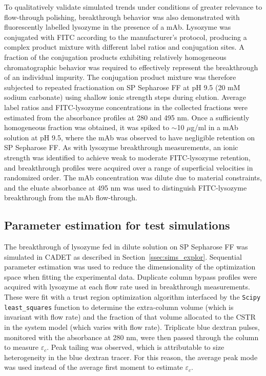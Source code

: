 \documentclass[preprint,review,12pt]{elsarticle}
\begin{document}
        To qualitatively validate simulated trends under conditions of greater relevance to flow-through polishing, breakthrough behavior was also demonstrated with fluorescently labelled lysozyme in the presence of a mAb. Lysozyme was conjugated with FITC according to the manufacturer's protocol, producing a complex product mixture with different label ratios and conjugation sites. A fraction of the conjugation products exhibiting relatively homogeneous chromatographic behavior was required to effectively represent the breakthrough of an individual impurity. The conjugation product mixture was therefore subjected to repeated fractionation on SP Sepharose FF at pH 9.5 (20 mM sodium carbonate) using shallow ionic strength steps during elution. Average label ratios and FITC-lysozyme concentrations in the collected fractions were estimated from the absorbance profiles at 280 and 495 nm. Once a sufficiently homogeneous fraction was obtained, it was spiked to $\sim$10 $\mu$g/ml in a mAb solution at pH 9.5, where the mAb was observed to have negligible retention on SP Sepharose FF. As with lysozyme breakthrough measurements, an ionic strength was identified to achieve weak to moderate FITC-lysozyme retention, and breakthrough profiles were acquired over a range of superficial velocities in randomized order. The mAb concentration was dilute due to material constraints, and the eluate absorbance at 495 nm was used to distinguish FITC-lysozyme breakthrough from the mAb flow-through.



    \subsection{Parameter estimation for test simulations} \label{ssec:params}
        The breakthrough of lysozyme fed in dilute solution on SP Sepharose FF was simulated in CADET as described in Section~\ref{ssec:sims_explor}. Sequential parameter estimation was used to reduce the dimensionality of the optimization space when fitting the experimental data. Duplicate column bypass profiles were acquired with lysozyme at each flow rate used in breakthrough measurements. These were fit with a trust region optimization algorithm interfaced by the \texttt{Scipy} \texttt{least\_squares} function to determine the extra-column volume (which is invariant with flow rate) and the fraction of that volume allocated to the CSTR in the system model (which varies with flow rate). Triplicate blue dextran pulses, monitored with the absorbance at 280 nm, were then passed through the column to measure $\varepsilon_c$. Peak tailing was observed, which is attributable to size heterogeneity in the blue dextran tracer. For this reason, the average peak mode was used instead of the average first moment to estimate $\varepsilon_c$.
\end{document}
